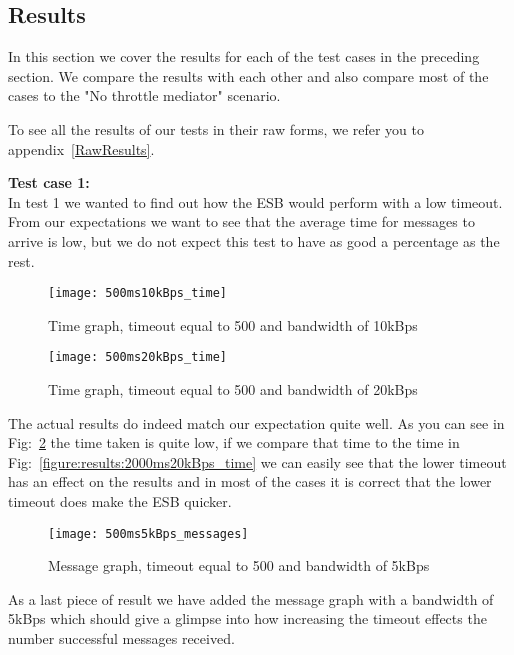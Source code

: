 \subsection{Results}\label{Testing:Results}
	In this section we cover the results for each of the test cases in the preceding section. We compare the results with each other and also compare most of the cases to the "No throttle mediator" scenario.
	
	\begin{shaded}
	To see all the results of our tests in their raw forms, we refer you to \mbox{appendix~\ref{RawResults}}.
	\end{shaded}
	 
    \textbf{Test case 1:}\\
    In test 1 we wanted to find out how the ESB would perform with a low timeout. From our expectations we want to see that the average time for messages to arrive is low, but we do not expect this test to have as good a percentage as the rest. 
    
	\begin{figure}[H]
		\centering
		\texttt{[image: 500ms10kBps\_time]}
		\caption{Time graph, timeout equal to 500 and bandwidth of 10kBps} 
		\label{figure:results:500ms10kBps_time}
	\end{figure}
	
	\begin{figure}[H]
		\centering
		\texttt{[image: 500ms20kBps\_time]}
		\caption{Time graph, timeout equal to 500 and bandwidth of 20kBps} 
		\label{figure:results:500ms20kBps_time}
	\end{figure}
    
    The actual results do indeed match our expectation quite well. As you can see in Fig:~\ref{figure:results:500ms20kBps_time} the time taken is quite low, if we compare that time to the time in Fig:~\ref{figure:results:2000ms20kBps_time} we can easily see that the lower timeout has an effect on the results and in most of the cases it is correct that the lower timeout does make the ESB quicker.
    
    \begin{figure}[H]
		\centering
		\texttt{[image: 500ms5kBps\_messages]}
		\caption{Message graph, timeout equal to 500 and bandwidth of 5kBps} 
		\label{figure:results:500ms5kBps_messages}
	\end{figure}
	
	As a last piece of result we have added the message graph with a bandwidth of 5kBps which should give a glimpse into how increasing the timeout effects the number successful messages received.
    
